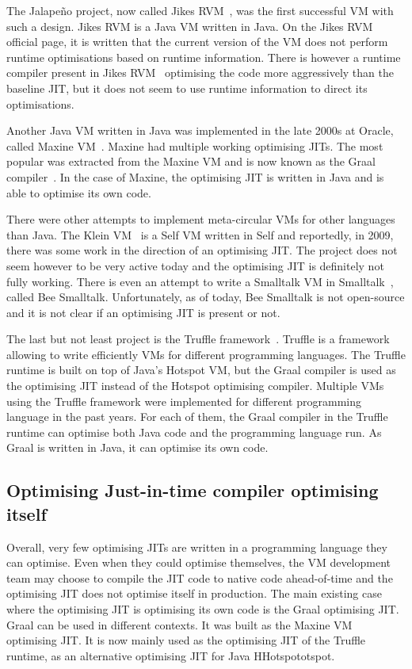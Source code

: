 \documentclass[a4paper,12pt,twoside]{../includes/ThesisStyle}
\begin{document}
The Jalape\~no project, now called Jikes RVM~\cite{Alp99a}, was the first successful VM with such a design. Jikes RVM is a Java VM written in Java. On the Jikes RVM official page, it is written that the current version of the VM does not perform runtime optimisations based on runtime information. There is however a runtime compiler present in Jikes RVM~\cite{Arn00} optimising the code more aggressively than the baseline JIT, but it does not seem to use runtime information to direct its optimisations. 


Another Java VM written in Java was implemented in the late 2000s at Oracle, called Maxine VM~\cite{Wimm13a}. Maxine had multiple working optimising JITs. The most popular was extracted from the Maxine VM and is now known as the Graal compiler~\cite{Oracle13,Dubo13c}. In the case of Maxine, the optimising JIT is written in Java and is able to optimise its own code.

There were other attempts to implement meta-circular VMs for other languages than Java. The Klein VM~\cite{Unga05b} is a Self VM written in Self and reportedly, in 2009, there was some work in the direction of an optimising JIT. The project does not seem however to be very active today and the optimising JIT is definitely not fully working. There is even an attempt to write a Smalltalk VM in Smalltalk~\cite{Pim14a}, called Bee Smalltalk. Unfortunately, as of today, Bee Smalltalk is not open-source and it is not clear if an optimising JIT is present or not.

The last but not least project is the Truffle framework~\cite{Wur13a}. Truffle is a framework allowing to write efficiently VMs for different programming languages. The Truffle runtime is built on top of Java's Hotspot VM, but the Graal compiler is used as the optimising JIT instead of the Hotspot optimising compiler. 
Multiple VMs using the Truffle framework were implemented for different programming language in the past years. For each of them, the Graal compiler in the Truffle runtime can optimise both Java code and the programming language run. As Graal is written in Java, it can optimise its own code.
 
\subsection{Optimising Just-in-time compiler optimising itself}

Overall, very few optimising JITs are written in a programming language they can optimise. Even when they could optimise themselves, the VM development team may choose to compile the JIT code to native code ahead-of-time and the optimising JIT does not optimise itself in production. The main existing case where the optimising JIT is optimising its own code is the Graal optimising JIT. Graal can be used in different contexts. It was built as the Maxine VM optimising JIT. It is now mainly used as the optimising JIT of the Truffle runtime, as an alternative optimising JIT for Java HHotspototspot.
\end{document}

